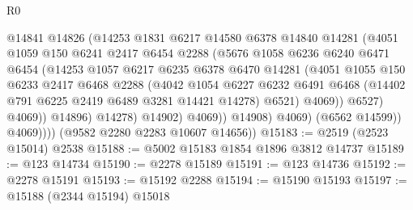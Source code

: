\begin{lexlean}{R0}
\begin{coremodule}
                              @14841
                              @14826
                              (@14253
                                @1831
                                @6217
                                @14580
                                @6378
                                @14840
                                @14281
                                (@4051
                                  @1059
                                  @150
                                  @6241
                                  @2417
                                  @6454
                                  @2288
                                  (@5676
                                    @1058
                                    @6236
                                    @6240
                                    @6471
                                    @6454
                                    (@14253
                                      @1057
                                      @6217
                                      @6235
                                      @6378
                                      @6470
                                      @14281
                                      (@4051
                                        @1055
                                        @150
                                        @6233
                                        @2417
                                        @6468
                                        @2288
                                        (@4042
                                          @1054
                                          @6227
                                          @6232
                                          @6491
                                          @6468
                                          (@14402 @791 @6225 @2419 @6489 @3281 @14421 @14278)
                                          @6521)
                                        @4069))
                                    @6527)
                                  @4069))
                              @14896)
                            @14278)
                          @14902)
                        @4069))
                    @14908)
                  @4069)
                (@6562 @14599))
              @4069))))
      (@9582 @2280 @2283 @10607 @14656))
@15183 := @2519 (@2523 @15014) @2538
@15188 := @5002 @15183 @1854 @1896 @3812 @14737
@15189 := @123 @14734
@15190 := @2278 @15189
@15191 := @123 @14736
@15192 := @2278 @15191
@15193 := @15192 @2288
@15194 := @15190 @15193
@15197 := @15188 (@2344 @15194) @15018

\end{coremodule}
\end{lexlean}

